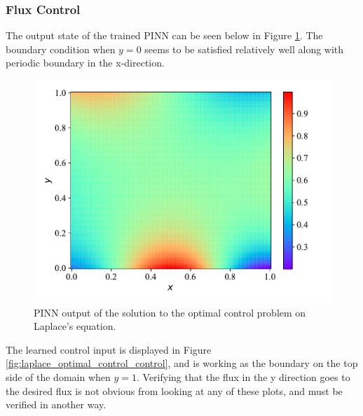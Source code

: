 \subsubsection{Flux Control}

The output state of the trained PINN can be seen below in Figure \ref{fig:laplace_optimal_control}. The boundary condition when $y = 0$ seems to be satisfied relatively well along with periodic boundary in the x-direction.

\begin{figure}[H]
    \centering
    \includegraphics[width=1.0\linewidth]{Figures/IntermediateExperiments/OptimalControl/laplace_optimal_control.pdf}
    \caption{PINN output of the solution to the optimal control problem on Laplace's equation.}
    \label{fig:laplace_optimal_control}
\end{figure}

The learned control input is displayed in Figure \ref{fig:laplace_optimal_control_control}, and is working as the boundary on the top side of the domain when $y = 1$. Verifying that the flux in the y direction goes to the desired flux is not obvious from looking at any of these plots, and must be verified in another way.

